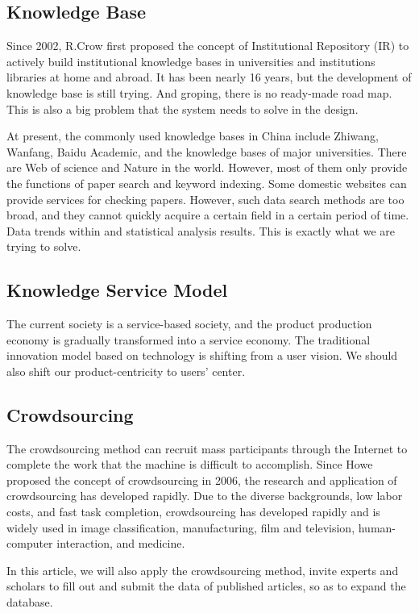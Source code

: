 \subsection{Knowledge Base}

Since 2002, R.Crow first proposed the concept of Institutional Repository (IR) to actively build institutional knowledge bases in universities and institutions libraries at home and abroad. It has been nearly 16 years, but the development of knowledge base is still trying. And groping, there is no ready-made road map. This is also a big problem that the system needs to solve in the design.

At present, the commonly used knowledge bases in China include Zhiwang, Wanfang, Baidu Academic, and the knowledge bases of major universities. There are Web of science and Nature in the world. However, most of them only provide the functions of paper search and keyword indexing. Some domestic websites can provide services for checking papers. However, such data search methods are too broad, and they cannot quickly acquire a certain field in a certain period of time. Data trends within and statistical analysis results. This is exactly what we are trying to solve.

\subsection{Knowledge Service Model}
The current society is a service-based society, and the product production economy is gradually transformed into a service economy. The traditional innovation model based on technology is shifting from a user vision. We should also shift our product-centricity to users’ center.

\subsection{Crowdsourcing}
The crowdsourcing method can recruit mass participants through the Internet to complete the work that the machine is difficult to accomplish. Since Howe proposed the concept of crowdsourcing in 2006, the research and application of crowdsourcing has developed rapidly. Due to the diverse backgrounds, low labor costs, and fast task completion, crowdsourcing has developed rapidly and is widely used in image classification, manufacturing, film and television, human-computer interaction, and medicine.

In this article, we will also apply the crowdsourcing method, invite experts and scholars to fill out and submit the data of published articles, so as to expand the database.

